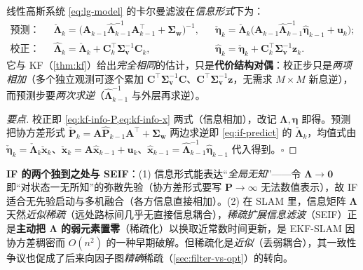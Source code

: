 \begin{proposition}[信息滤波（IF）递归]\label{prop:info-filter}
线性高斯系统 \cref{eq:lg-model} 的卡尔曼滤波在\emph{信息形式}下为\cite{thrun2005probabilistic,barfoot2024state}：
\begin{align}
  \text{预测：}\quad
  &\check{\boldsymbol{\Lambda}}_k=\big(\mathbf{A}_{k-1}\hat{\boldsymbol{\Lambda}}_{k-1}^{-1}\mathbf{A}_{k-1}^\top+\boldsymbol{\Sigma}_{\mathbf{w}}\big)^{-1},
  &&\check{\boldsymbol{\eta}}_k=\check{\boldsymbol{\Lambda}}_k\big(\mathbf{A}_{k-1}\hat{\boldsymbol{\Lambda}}_{k-1}^{-1}\hat{\boldsymbol{\eta}}_{k-1}+\mathbf{u}_k\big);
  \label{eq:if-predict}\\
  \text{校正：}\quad
  &\hat{\boldsymbol{\Lambda}}_k=\check{\boldsymbol{\Lambda}}_k+\mathbf{C}_k^\top\boldsymbol{\Sigma}_{\mathbf{v}}^{-1}\mathbf{C}_k,
  &&\hat{\boldsymbol{\eta}}_k=\check{\boldsymbol{\eta}}_k+\mathbf{C}_k^\top\boldsymbol{\Sigma}_{\mathbf{v}}^{-1}\mathbf{z}_k.
  \label{eq:if-correct}
\end{align}
它与 KF（\cref{thm:kf}）给出\emph{完全相同}的估计，只是\textbf{代价结构对偶}：校正步只是\emph{两项相加}（多个独立观测可逐个累加 $\mathbf{C}^\top\boldsymbol{\Sigma}_{\mathbf{v}}^{-1}\mathbf{C}$、$\mathbf{C}^\top\boldsymbol{\Sigma}_{\mathbf{v}}^{-1}\mathbf{z}$，无需求 $M\times M$ 新息逆），而预测步要\emph{两次求逆}（$\hat{\boldsymbol{\Lambda}}_{k-1}^{-1}$ 与外层再求逆）。
\end{proposition}
\begin{proof}[要点]
校正即 \cref{eq:kf-info-P,eq:kf-info-x} 两式（信息相加），改记 $\boldsymbol{\Lambda},\boldsymbol{\eta}$ 即得。预测把协方差形式 $\check{\mathbf{P}}_k=\mathbf{A}\hat{\mathbf{P}}_{k-1}\mathbf{A}^\top+\boldsymbol{\Sigma}_{\mathbf{w}}$ 两边求逆即 \cref{eq:if-predict} 的 $\check{\boldsymbol{\Lambda}}_k$，均值式由 $\check{\boldsymbol{\eta}}_k=\check{\boldsymbol{\Lambda}}_k\check{\mathbf{x}}_k$、$\check{\mathbf{x}}_k=\mathbf{A}\hat{\mathbf{x}}_{k-1}+\mathbf{u}_k$、$\hat{\mathbf{x}}_{k-1}=\hat{\boldsymbol{\Lambda}}_{k-1}^{-1}\hat{\boldsymbol{\eta}}_{k-1}$ 代入得到。\hfill$\square$
\end{proof}

\begin{insight}
\textbf{IF 的两个独到之处与 SEIF}：(1) 信息形式能表达“\emph{全局无知}”——令 $\boldsymbol{\Lambda}\to\mathbf{0}$ 即“对状态一无所知”的弥散先验（协方差形式要写 $\mathbf{P}\to\infty$ 无法数值表示），故 IF 适合无先验启动与多机融合（各方信息直接相加）。(2) 在 SLAM 里，信息矩阵 $\boldsymbol{\Lambda}$ 天然\emph{近似稀疏}（远处路标间几乎无直接信息耦合），\emph{稀疏扩展信息滤波}（SEIF\cite{thrun2005probabilistic}）正是\textbf{主动把 $\boldsymbol{\Lambda}$ 的弱元素置零}（稀疏化）以换取近常数时间更新，是 EKF-SLAM 因协方差稠密而 $O(n^2)$ 的一种早期破解。但稀疏化是\emph{近似}（丢弱耦合），其一致性争议也促成了后来向因子图\emph{精确}稀疏（\cref{sec:filter-vs-opt}）的转向。
\end{insight}

